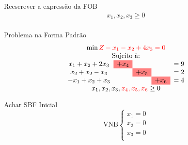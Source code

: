\begin{frame}
\begin{columns}
\begin{column}{0.7\textwidth}
{\begin{block}{Reescrever a expressão da FOB}
\begin{equation*}
\begin{matrix}
							x_1, x_2, x_3 \ge 0 \\
						\end{matrix}
					\end{equation*}
		 		\end{block}
	 		}
	 		{	
		 		\begin{block}{Problema na Forma Padrão}
					\begin{equation*}
						\begin{matrix}
							\min { \color{red}Z - x_1 - x_2 + 4x_3 = 0} \\
							\text{Sujeito à:} \\
							\begin{matrix}
								x_1 + x_2 + 2x_3 & \cellcolor{red!50}+x_4 &  &  & = 9 \\
								x_2 + x_2 - x_3  & & \cellcolor{red!50}+x_5  &  & = 2 \\
								-x_1 + x_2 + x_3 & & & \cellcolor{red!50}+x_6   & = 4 \\
							\end{matrix} \\
							x_1, x_2, x_3, {\color{red} x_4, x_5, x_6} \ge 0 \\
						\end{matrix}
					\end{equation*}
		 		\end{block}
	 		}
	 		{
		 		\begin{block}{Achar SBF Inicial}
			 		\begin{equation*}
							\text{VNB} \left\{\begin{matrix}
							x_1 = 0 \\ 
							x_2 = 0 \\
							x_3 = 0 \\ 
							\end{matrix}\right.
			 		\end{equation*}


\end{block}}
\end{column}
\end{columns}
\end{frame}
